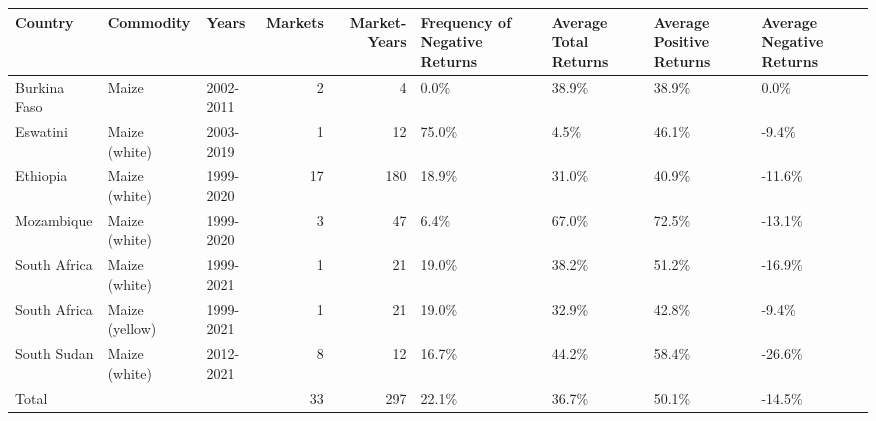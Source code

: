 \begin{table}[ht]
\centering
\begin{tabular}{lllrrllll}
  \hline
Country & Commodity & Years & Markets & Market-Years & Frequency of Negative Returns & Average Total Returns & Average Positive Returns & Average Negative Returns \\ 
  \hline
Burkina Faso & Maize & 2002-2011 &   2 &   4 & 0.0\% & 38.9\% & 38.9\% & 0.0\% \\ 
  Eswatini & Maize (white) & 2003-2019 &   1 &  12 & 75.0\% & 4.5\% & 46.1\% & -9.4\% \\ 
  Ethiopia & Maize (white) & 1999-2020 &  17 & 180 & 18.9\% & 31.0\% & 40.9\% & -11.6\% \\ 
  Mozambique & Maize (white) & 1999-2020 &   3 &  47 & 6.4\% & 67.0\% & 72.5\% & -13.1\% \\ 
  South Africa & Maize (white) & 1999-2021 &   1 &  21 & 19.0\% & 38.2\% & 51.2\% & -16.9\% \\ 
  South Africa & Maize (yellow) & 1999-2021 &   1 &  21 & 19.0\% & 32.9\% & 42.8\% & -9.4\% \\ 
  South Sudan & Maize (white) & 2012-2021 &   8 &  12 & 16.7\% & 44.2\% & 58.4\% & -26.6\% \\ 
  Total &   &   &  33 & 297 & 22.1\% & 36.7\% & 50.1\% & -14.5\% \\ 
   \hline
\end{tabular}
\end{table}
